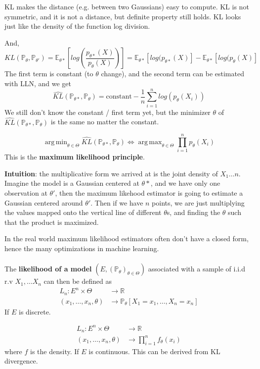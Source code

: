 \documentclass{article}
\DeclareMathOperator*{\argmax}{arg\,max}
\DeclareMathOperator*{\argmin}{arg\,min}
\begin{document}
KL makes the distance (e.g. between two Gaussians) easy to compute. KL is not symmetric, and it is not a distance, but definite property still holds.
KL looks just like the density of the function log division.

And,
$$
KL(\mathbb{P}_{\theta}, \mathbb{P}_{\theta'}) = \mathbb{E}_{\theta*}[log(\frac{p_{\theta*}(X)}{p_{\theta}(X)})] = \mathbb{E}_{\theta*}[log(p_{\theta*}(X)] - \mathbb{E}_{\theta*}[log(p_{\theta}(X)]
$$
The first term is constant (to $\theta$ change), and the second term can be estimated with LLN, and we get
$$
\hat{KL}(\mathbb{P}_{\theta*}, \mathbb{P}_{\theta}) = \text{constant} - \frac{1}{n} \sum_{i=1}^{n}{log(p_{\theta}(X_i))}
$$
We still don't know the constant / first term yet, but the minimizer $\theta$ of $\hat{KL}(\mathbb{P}_{\theta*}, \mathbb{P}_{\theta})$ is the same no matter the constant.

$$
\argmin_{\theta \in \Theta} \hat{KL}(\mathbb{P}_{\theta*}, \mathbb{P}_{\theta}) \iff \argmax_{\theta \in \Theta} \prod_{i = 1}^{n} p_{\theta}(X_i)
$$
This is the \textbf{maximum likelihood principle}.

\textbf{Intuition}: the multiplicative form we arrived at is the joint density of $X_1 \dots n$. Imagine the model is a Gaussian centered at $\theta*$, and we have only one observation at $\theta'$, then the maximum likehood estimator is going to estimate a Gaussian centered around $\theta'$.
Then if we have $n$ points, we are just multiplying the values mapped onto the vertical line of different $\theta$s, and finding the $\theta$ such that the product is maximized.

In the real world maximum likelihood estimators often don't have a closed form, hence the many optimizations in machine learning.
\\
\\
The \textbf{likelihood of a model} $(E, (\mathbb{P}_{\theta})_{\theta \in \Theta})$ associated with a sample of i.i.d r.v $X_1, \dots X_n$ can then be defined as
\begin{align*}
L_n : E^n \times \Theta & \to \mathbb{R} \\
(x_1, \dots, x_n, \theta) & \to \mathbb{P}_{\theta}[X_1 = x_1, \dots, X_n = x_n]
\end{align*}
If $E$ is discrete.

\begin{align*}
  L_n : E^n \times \Theta & \to \mathbb{R} \\
  (x_1, \dots, x_n, \theta) & \to \prod_{i=1}^{n} f_{\theta}(x_i)
\end{align*}
where $f$ is the density. If $E$ is continuous.
This can be derived from KL divergence.
\end{document}
